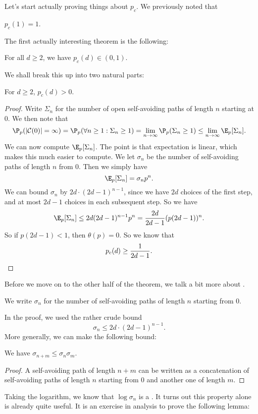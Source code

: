 \documentclass[a4paper]{article}
\begin{document}
Let's start actually proving things about $p_c$. We previously noted that
\begin{prop}
  $p_c(1) = 1$.
\end{prop}

The first actually interesting theorem is the following:
\begin{thm}
  For all $d \geq 2$, we have $p_c(d) \in (0, 1)$.
\end{thm}

We shall break this up into two natural parts:
\begin{lemma}
  For $d \geq 2$, $p_c(d) > 0$.
\end{lemma}

\begin{proof}
  Write $\Sigma_n$ for the number of open self-avoiding paths of length $n$ starting at $0$. We then note that
  \[
    \P_p(|\mathcal{C}(0)| = \infty) = \P_p(\forall n \geq 1: \Sigma_n \geq 1) = \lim_{n \to \infty} \P_p(\Sigma_n \geq 1) \leq \lim_{n \to \infty} \E_p[\Sigma_n].
  \]
  We can now compute $\E_p[\Sigma_n]$. The point is that expectation is linear, which makes this much easier to compute. We let $\sigma_n$ be the number of self-avoiding paths of length $n$ from $0$. Then we simply have
  \[
    \E_p[\Sigma_n] = \sigma_n p^n.
  \]
  We can bound $\sigma_n$ by $2d \cdot (2d - 1)^{n - 1}$, since we have $2d$ choices of the first step, and at most $2d - 1$ choices in each subsequent step. So we have
  \[
    \E_p[\Sigma_n] \leq 2d (2d - 1)^{n - 1} p^n = \frac{2d}{2d - 1} (p(2d - 1))^n.
  \]
  So if $p (2d - 1) < 1$, then $\theta(p) = 0$. So we know that
  \[
    p_c(d) \geq \frac{1}{2d - 1}.\qedhere
  \]
\end{proof}

Before we move on to the other half of the theorem, we talk a bit more about .
\begin{defi}[$\sigma_n$]
  We write $\sigma_n$ for the number of self-avoiding paths of length $n$ starting from $0$.
\end{defi}
In the proof, we used the rather crude bound
\[
  \sigma_n \leq 2d \cdot (2d - 1)^{n - 1}.
\]
More generally, we can make the following bound:

\begin{lemma}
  We have $\sigma_{n + m} \leq \sigma_n \sigma_m$.
\end{lemma}

\begin{proof}
  A self-avoiding path of length $n + m$ can be written as a concatenation of self-avoiding paths of length $n$ starting from $0$ and another one of length $m$.
\end{proof}
Taking the logarithm, we know that $\log \sigma_n$ is a . It turns out this property alone is already quite useful. It is an exercise in analysis to prove the following lemma:
\end{document}
